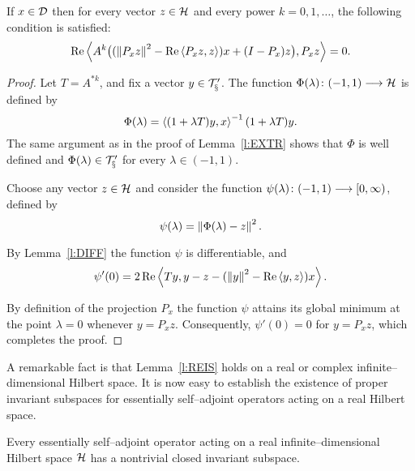 \medskip

\begin{lem}\label{l:REIS}
If $x\in{\cal{D}}$ then for every vector $z\in{\cal H}$ and every power
$k=0,1,\ldots$, the following condition is satisfied:
\[ \operatorname{Re}\left<A^k\big((\left\Vert P_x z\right\Vert^2 - \operatorname{Re}\left<P_x z,z\right>)x + (I-P_x)z\big),
   P_x z\right> = 0.  \]
\end{lem}

\begin{proof}
Let $T=A^{*k}$, and fix a vector $y\in\cal{T}'_x$. The function
$\Phi(\lambda)\colon(-1,1)\longrightarrow{\cal H}$ is defined by
\[ \Phi(\lambda) = \left<(1+\lambda T)y, x\right>^{-1} (1+\lambda T)y. \]
The same argument as in the proof of Lemma~\ref{l:EXTR} shows
that $\Phi$ is well defined and $\Phi(\lambda)\in\cal{T}'_x$
for every $\lambda\in(-1,1)$.

Choose any vector $z\in{\cal H}$ and consider the function
$\psi(\lambda)\colon(-1,1)\longrightarrow[0,\infty)$, defined by
\[ \psi(\lambda)=\left\Vert\Phi(\lambda) - z\right\Vert^2. \]

By Lemma~\ref{l:DIFF} the function $\psi$ is differentiable,
and
\[ \psi'(0) = 2\operatorname{Re}\left<T y, y - z - (\left\Vert y\right\Vert^2-\operatorname{Re}\left<y,z\right>) x\right>. \]

By definition of the projection $P_x$ the function $\psi$
attains its global minimum at the point $\lambda=0$ whenever
$y=P_x z$. Consequently, $\psi'(0)=0$ for $y=P_x z$, which
completes the proof.
\end{proof}

\medskip

A remarkable fact is that Lemma~\ref{l:REIS} holds on a real or
complex infinite--dimensional Hilbert space. It is now easy to
establish the existence of proper invariant subspaces for
essentially self--adjoint operators acting on a real Hilbert
space.

\begin{thm}\label{t:ISR}
Every essentially self--adjoint operator acting on a real
infinite--dimensional Hilbert space ${\cal H}$ has a nontrivial
closed invariant subspace.
\end{thm}

